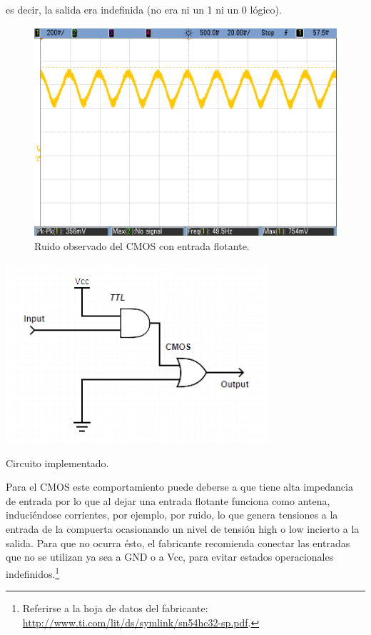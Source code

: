 es decir, la salida era indefinida (no era ni un 1 ni un 0 lógico). 
 \vspace{5mm}
\begin{figure}[H]
    \centering
    \includegraphics[width=.5\linewidth]{./ruidoCMOS.png}
    \caption{Ruido observado del CMOS con entrada flotante.}
    \label{fig:ruidoCMOS}
\end{figure}
\begin{table}
    \begin{center}
        \includegraphics[scale=0.5]{./circuito.jpg}
        \caption{Circuito implementado.}
        \label{fig:circuito}
    \end{center}
\end{table} 
\par
\vspace{10mm}
Para el CMOS este comportamiento puede deberse a que tiene alta impedancia de entrada por lo que al dejar una entrada flotante
funciona como antena, induciéndose corrientes, por ejemplo, por ruido, lo que genera tensiones a la entrada de la compuerta
ocasionando un nivel de tensión high o low incierto a la salida.
Para que no ocurra ésto, el fabricante recomienda conectar las entradas que no se utilizan ya sea a GND o a Vcc, 
para evitar estados operacionales indefinidos.\footnote{Referirse a la hoja de datos del fabricante: \url{http://www.ti.com/lit/ds/symlink/sn54hc32-sp.pdf}.}\\\newline

